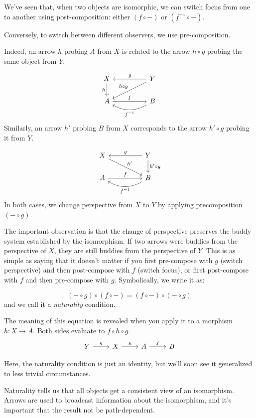 \documentclass[DaoFP]{subfiles}
\begin{document}
We've seen that, when two objects are isomorphic, we can switch focus from one to another using post-composition: either $(f \circ -)$ or $(f^{-1} \circ -)$. 

Conversely, to switch between different observers, we use pre-composition. 

Indeed, an arrow $h$ probing $A$ from $X$ is related to the arrow $h\circ g$ probing the same object from $Y$.

\[
 \begin{tikzcd}
 X
 \arrow[d, "h"']
 && Y
 \arrow[ll, "g"']
  \arrow[dll, "h \circ g"']
 \\
 A
 \arrow[rr, "f"]
  && B
 \arrow[ll, bend left,  "f^{-1}"]
 \end{tikzcd}
\]
Similarly, an arrow $h'$ probing $B$ from $X$ corresponds to the arrow $h' \circ g$ probing it from $Y$. 

\[
 \begin{tikzcd}
 X
 \arrow[drr, "h'"]
 && Y
 \arrow[ll, "g"']
  \arrow[d, "h' \circ g"]
 \\
 A
 \arrow[rr, "f"]
  && B
 \arrow[ll, bend left,  "f^{-1}"]
 \end{tikzcd}
\]
In both cases, we change perspective from $X$ to $Y$ by applying precomposition $(- \circ g)$.

The important observation is that the change of perspective preserves the buddy system established by the isomorphism. If two arrows were buddies from the perspective of $X$, they are still buddies from the perspective of $Y$. This is as simple as saying that it doesn't matter if you first pre-compose with $g$ (switch perspective) and then post-compose with $f$ (switch focus), or first post-compose with $f$ and then pre-compose with $g$. Symbolically, we write it as:

\[(- \circ g) \circ (f \circ -) = (f \circ -) \circ (- \circ g)\]
and we call it a \emph{naturality} condition.

The meaning of this equation is revealed when you apply it to a morphism $h \colon X \to A$. Both sides evaluate to $f \circ h \circ g$.  \[
 \begin{tikzcd}
 Y \arrow[r, "g"] &X \arrow[r, "h"] & A \arrow[r, "f"] & B
\end{tikzcd}
\]

Here, the naturality condition is just an identity, but we'll soon see it generalized to less trivial circumstances.


Naturality tells us that all objects get a consistent view of an isomorphism. Arrows are used to broadcast information about the isomorphism, and it's important that the result not be path-dependent. 
\end{document}
